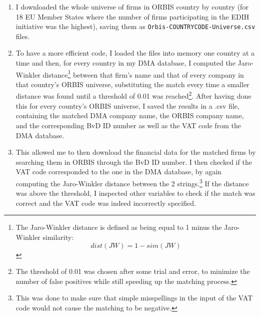 \documentclass[12pt]{report}
\begin{document}
\begin{enumerate}
    \item I downloaded the whole universe of firms in ORBIS country by country (for 18 EU Member States where the number of firms participating in the EDIH initiative was the highest), saving them as \texttt{Orbis-COUNTRYCODE-Universe.csv} files.
    \item To have a more efficient code, I loaded the files into memory one country at a time and then, for every country in my DMA database, I computed the Jaro-Winkler distance\footnote{The Jaro-Winkler distance is defined as being equal to 1 minus the Jaro-Winkler similarity: $$dist(JW) = 1 - sim(JW)$$} between that firm's name and that of every company in that country's ORBIS universe, substituting the match every time a smaller distance was found until a threshold of 0.01 was reached\footnote{The threshold of 0.01 was chosen after some trial and error, to minimize the number of false positives while still speeding up the matching process.}. After having done this for every country's ORBIS universe, I saved the results in a .csv file, containing the matched DMA company name, the ORBIS company name, and the corresponding BvD ID number as well as the VAT code from the DMA database.
    \item This allowed me to then download the financial data for the matched firms by searching them in ORBIS through the BvD ID number. I then checked if the VAT code corresponded to the one in the DMA database, by again computing the Jaro-Winkler distance between the 2 strings.\footnote{This was done to make sure that simple misspellings in the input of the VAT code would not cause the matching to be negative.} If the distance was above the threshold, I inspected other variables to check if the match was correct and the VAT code was indeed incorrectly specified.
\end{enumerate}
\end{document}
